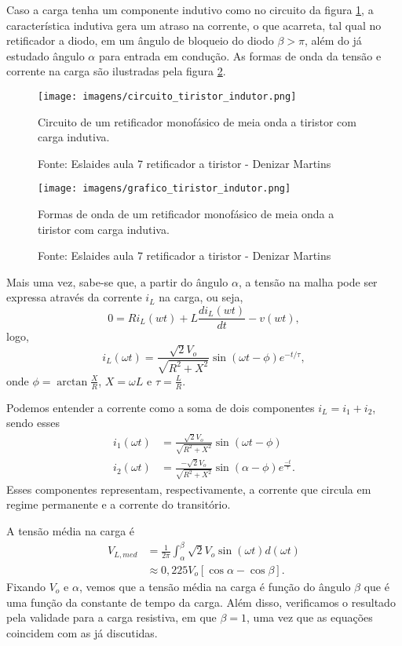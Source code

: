 Caso a carga tenha um componente indutivo como no circuito da figura \ref{cti}, a característica indutiva gera um atraso na corrente, o que acarreta, tal qual no retificador a diodo, em um ângulo de bloqueio do diodo $\beta > \pi$, além do já estudado ângulo $\alpha$ para entrada em condução. As formas de onda da tensão e corrente na carga são ilustradas pela figura \ref{gti}.

\begin{figure}[h]
\center
\texttt{[image: imagens/circuito\_tiristor\_indutor.png]}
\caption{Circuito de um retificador monofásico de meia onda a tiristor com carga indutiva.}\label{cti}
\caption*{Fonte: Eslaides aula 7 retificador a tiristor - Denizar Martins}
\end{figure}

\begin{figure}[h]
\center
\texttt{[image: imagens/grafico\_tiristor\_indutor.png]}
\caption{Formas de onda de um retificador monofásico de meia onda a tiristor com carga indutiva.}\label{gti}
\caption*{Fonte: Eslaides aula 7 retificador a tiristor - Denizar Martins}
\end{figure}

Mais uma vez, sabe-se que, a partir do ângulo $\alpha$, a tensão na malha pode ser expressa através da corrente $i_L$ na carga, ou seja, \[
0 = Ri_{L}(wt) + L\frac{di_{L}(wt)}{dt} -v(wt)
,\] logo, \[
i_{L}(\omega{t}) = {\frac{\sqrt{2}V_o}{\sqrt{R^2 + X^2}}\sin{\left(\omega{t}-\phi\right)}e^{-t/\tau}}
,\] onde $\phi = \arctan{\frac{X}{R}}$, $ {X} = \omega{L} $ e $\tau = \frac{L}{R}$.

Podemos entender a corrente como a soma de dois componentes $i_L = i_1 + i_2$, sendo esses 
\begin{align*}
    i_{1}(\omega{t}) &= {\frac{\sqrt{2}V_o}{\sqrt{R^2 + X^2}}\sin{\left(\omega{t}-\phi\right)}} \\
    i_{2}(\omega{t}) &= {\frac{-\sqrt{2}V_o}{\sqrt{R^2 + X^2}}\sin{\left(\alpha-\phi\right)}e^{\frac{-t}{\tau}}}
.\end{align*}
Esses componentes representam, respectivamente, a corrente que circula em regime permanente e a corrente do transitório.

A tensão média na carga é
\begin{align*}
    V_{L,med} &= \frac{1}{2\pi}\int_\alpha^{\beta}\sqrt{2}V_o\sin(\omega t)d(\omega t) \\
&\approx 0,225 V_o[\cos\alpha - \cos\beta]
.\end{align*}
Fixando $V_{o}$ e $\alpha$, vemos que a tensão média na carga é função do ângulo $\beta$ que é uma função da constante de tempo da carga. Além disso, verificamos o resultado pela validade para a carga resistiva, em que $\beta = 1$, uma vez que as equações coincidem com as já discutidas.


